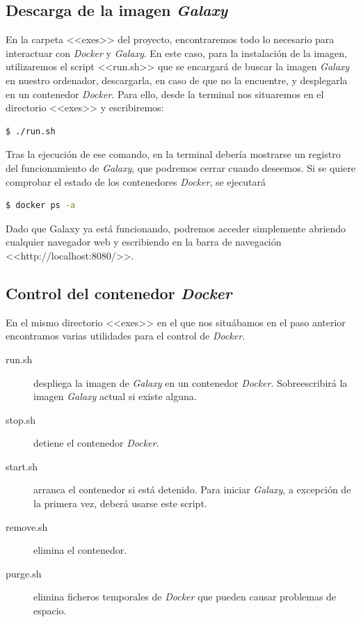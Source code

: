 \subsection{Descarga de la imagen \textit{Galaxy}}
En la carpeta <<exes>> del proyecto, encontraremos todo lo necesario para interactuar con \textit{Docker} y \textit{Galaxy}. En este caso, para la instalación de la imagen, utilizaremos el script <<run.sh>> que se encargará de buscar la imagen \textit{Galaxy} en nuestro ordenador, descargarla, en caso de que no la encuentre, y desplegarla en un contenedor \textit{Docker}. Para ello, desde la terminal nos situaremos en el directorio <<exes>> y escribiremos:
    \begin{lstlisting}[language=bash]
    $ ./run.sh
    \end{lstlisting}
Tras la ejecución de ese comando, en la terminal debería mostrarse un registro del funcionamiento de \textit{Galaxy}, que podremos cerrar cuando deseemos. Si se quiere comprobar el estado de los contenedores \textit{Docker}, se ejecutará
\begin{lstlisting}[language=bash]
    $ docker ps -a
\end{lstlisting}
Dado que Galaxy ya está funcionando, podremos acceder simplemente abriendo cualquier navegador web y escribiendo en la barra de navegación <<http://localhost:8080/>>.
\subsection{Control del contenedor \textit{Docker}}
En el mismo directorio <<exes>> en el que nos situábamos en el paso anterior encontramos varias utilidades para el control de \textit{Docker}.
\begin{description}
    \item[run.sh] despliega la imagen de \textit{Galaxy} en un contenedor \textit{Docker}. Sobreescribirá la imagen \textit{Galaxy} actual si existe alguna.
    \item[stop.sh] detiene el contenedor \textit{Docker}.
    \item[start.sh] arranca el contenedor si está detenido. Para iniciar \textit{Galaxy}, a excepción de la primera vez, deberá usarse este script.
    \item[remove.sh] elimina el contenedor.
    \item[purge.sh] elimina ficheros temporales de \textit{Docker} que pueden causar problemas de espacio.
\end{description}
